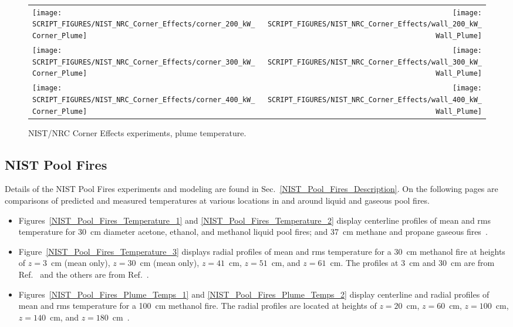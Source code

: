 \begin{figure}[!h]
\begin{tabular*}{\textwidth}{l@{\extracolsep{\fill}}r}
\texttt{[image: SCRIPT\_FIGURES/NIST\_NRC\_Corner\_Effects/corner\_200\_kW\_Corner\_Plume]} &
\texttt{[image: SCRIPT\_FIGURES/NIST\_NRC\_Corner\_Effects/wall\_200\_kW\_Wall\_Plume]} \\
\texttt{[image: SCRIPT\_FIGURES/NIST\_NRC\_Corner\_Effects/corner\_300\_kW\_Corner\_Plume]} &
\texttt{[image: SCRIPT\_FIGURES/NIST\_NRC\_Corner\_Effects/wall\_300\_kW\_Wall\_Plume]} \\
\texttt{[image: SCRIPT\_FIGURES/NIST\_NRC\_Corner\_Effects/corner\_400\_kW\_Corner\_Plume]} &
\texttt{[image: SCRIPT\_FIGURES/NIST\_NRC\_Corner\_Effects/wall\_400\_kW\_Wall\_Plume]}
\end{tabular*}
\caption[NIST/NRC Corner Effects experiments, plume temperature]
{NIST/NRC Corner Effects experiments, plume temperature.}
\label{NIST_NRC_Corner_Plume_Temp}
\end{figure}


\clearpage

\subsection{NIST Pool Fires}
\label{NIST_Pool_Fires_Plume_Temps}

Details of the NIST Pool Fires experiments and modeling are found in Sec.~\ref{NIST_Pool_Fires_Description}. On the following pages are comparisons of predicted and measured temperatures at various locations in and around liquid and gaseous pool fires.
\begin{itemize}
\item Figures~\ref{NIST_Pool_Fires_Temperature_1} and \ref{NIST_Pool_Fires_Temperature_2} display centerline profiles of mean and rms temperature for 30~cm diameter acetone, ethanol, and methanol liquid pool fires; and 37~cm methane and propane gaseous fires~\cite{Falkenstein-Smith:2019}.
\item Figure~\ref{NIST_Pool_Fires_Temperature_3} displays radial profiles of mean and rms temperature for a 30~cm methanol fire at heights of $z=3$~cm (mean only), $z=30$~cm (mean only), $z=41$~cm, $z=51$~cm, and $z=61$~cm. The profiles at 3~cm and 30~cm are from Ref.~\cite{Hamins:TN1928} and the others are from Ref.~\cite{Sung:TN2021}.
\item Figures~\ref{NIST_Pool_Fires_Plume_Temps_1} and \ref{NIST_Pool_Fires_Plume_Temps_2} display centerline and radial profiles of mean and rms temperature for a 100~cm methanol fire. The radial profiles are located at heights of $z=20$~cm, $z=60$~cm, $z=100$~cm, $z=140$~cm, and $z=180$~cm~\cite{Sung:TN2019}.
\end{itemize}

